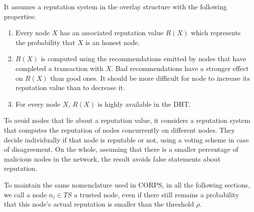 It assumes a reputation system in the overlay structure with the following properties:
\begin{enumerate}
  \item Every node $X$ has an associated reputation value $R(X)$
  which represents the probability that $X$ is an honest node.
  \item $R(X)$ is computed using the recommendations emitted
  by nodes that have completed a transaction with $X$. Bad
  recommendations have a stronger effect on $R(X)$ than
  good ones. It should be more difficult for node to
  increase its reputation value than to decrease it.
  \item For every node $X$, $R(X)$ is highly available in the DHT.
\end{enumerate}

To avoid nodes that lie about a reputation value, it considers a reputation
system that computes the reputation of nodes concurrently on different nodes.
They decide individually if that node is reputable or not, using a voting
scheme in case of disagreement. On the whole, assuming that there is a smaller
percentage of malicious nodes in the network, the result avoids
false statements about reputation.

To maintain the same nomenclature used in CORPS, in all the following sections,
we call a node $n_i \in TS$ a trusted node, even if there still remains a
probability that this node's actual reputation is smaller than the threshold
$\rho$.
 
 
